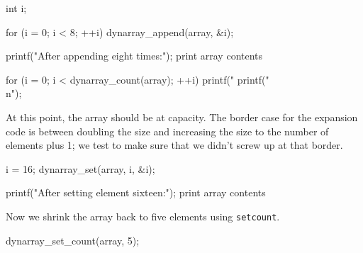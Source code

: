 \nwenddocs{}\endmoddef
int i;
\nwendcode{}\nwdocspar

\nwenddocs{}\plusendmoddef
for (i = 0; i < 8; ++i)
    dynarray_append(array, &i);

printf("After appending eight times:");
\LA{}print array contents~{\nwtagstyle{}}\RA{}
\nwendcode{}\nwdocspar

\nwenddocs{}\endmoddef
for (i = 0; i < dynarray_count(array); ++i)
    printf(" %
printf("\\n");
\nwendcode{}\nwdocspar

At this point, the array should be at capacity.  The border
case for the expansion code is between doubling the size
and increasing the size to the number of elements plus 1;
we test to make sure that we didn't screw up at that border.

\nwenddocs{}\plusendmoddef
i = 16;
dynarray_set(array, i, &i);

printf("After setting element sixteen:");
\LA{}print array contents~{\nwtagstyle{}}\RA{}
\nwendcode{}\nwdocspar

Now we shrink the array back to five elements using {\tt{}set{}count}.

\nwenddocs{}\plusendmoddef
dynarray_set_count(array, 5);

